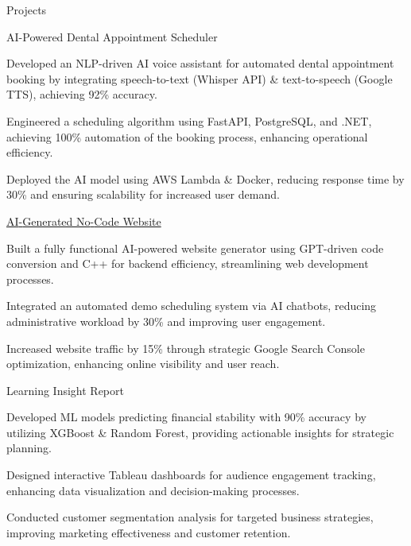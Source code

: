 \documentclass{resume} %
\begin{document}
    \begin{rSection}{Projects}
                    \begin{rSubsection}
                                    {AI{-}Powered Dental Appointment Scheduler}
                                {}{}{}
                                    \item Developed an NLP{-}driven AI voice assistant for automated dental appointment booking by integrating speech{-}to{-}text (Whisper API) \& text{-}to{-}speech (Google TTS), achieving 92\% accuracy.
                                    \item Engineered a scheduling algorithm using FastAPI, PostgreSQL, and .NET, achieving 100\% automation of the booking process, enhancing operational efficiency.
                                    \item Deployed the AI model using AWS Lambda \& Docker, reducing response time by 30\% and ensuring scalability for increased user demand.
                            \end{rSubsection}
                    \begin{rSubsection}
                                    {\href{www.civaroai.com}{AI{-}Generated No{-}Code Website}}
                                {}{}{}
                                    \item Built a fully functional AI{-}powered website generator using GPT{-}driven code conversion and C++ for backend efficiency, streamlining web development processes.
                                    \item Integrated an automated demo scheduling system via AI chatbots, reducing administrative workload by 30\% and improving user engagement.
                                    \item Increased website traffic by 15\% through strategic Google Search Console optimization, enhancing online visibility and user reach.
                            \end{rSubsection}
                    \begin{rSubsection}
                                    {Learning Insight Report}
                                {}{}{}
                                    \item Developed ML models predicting financial stability with 90\% accuracy by utilizing XGBoost \& Random Forest, providing actionable insights for strategic planning.
                                    \item Designed interactive Tableau dashboards for audience engagement tracking, enhancing data visualization and decision{-}making processes.
                                    \item Conducted customer segmentation analysis for targeted business strategies, improving marketing effectiveness and customer retention.
                            \end{rSubsection}
            \end{rSection}
\end{document}
